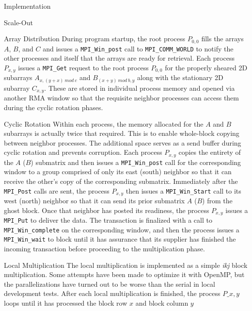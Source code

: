 \documentclass{article}
\begin{document}
\begin{section}{Implementation}
\begin{subsection}{Scale-Out}
\begin{paragraph}{}
    \end{paragraph}
    \begin{paragraph}{Array Distribution}
      During program startup, the root process $P_{0,0}$ fills the arrays $A$, $B$, and $C$ and issues a \texttt{MPI\_Win\_post} call to \texttt{MPI\_COMM\_WORLD}
      to notify the other processes and itself that the arrays are ready for retrieval. Each process $P_{x,y}$ issues a \texttt{MPI\_Get} request
      to the root process $P_{0,0}$ for the properly sheared 2D subarrays $A_{x,(y+x)\ mod\ c}$ and $B_{(x+y)\ mod\ b, y}$ along with the stationary
      2D subarray $C_{x,y}$. These are stored in individual process memory and opened via another RMA window so that the requisite neighbor processes
      can access them during the cyclic rotation phases.
    \end{paragraph}
    \begin{paragraph}{Cyclic Rotation}
      Within each process, the memory allocated for the $A$ and $B$ subarrays is actually twice that required. This is to enable whole-block copying
      between neighbor processes. The additional space serves as a send buffer during cyclic rotation and prevents corruption. Each process $P_{x,y}$
      copies the entirety of the $A$ ($B$) submatrix and then issues a \texttt{MPI\_Win\_post} call for the corresponding window to a group comprised of
      only its east (south) neighbor so that it can receive the other's copy of the corresponding submatrix. Immediately after the \texttt{MPI\_Post}
      calls are sent, the process $P_{x,y}$ then issues a \texttt{MPI\_Win\_Start} call to its west (north) neighbor so that it can send its prior submatrix
      $A$ ($B$) from the ghost block. Once that neighbor has posted its readiness, the process $P_{x,y}$ issues a \texttt{MPI\_Put} to deliver the data.
      The transaction is finalized with a call to \texttt{MPI\_Win\_complete} on the corresponding window, and then the process issues a \texttt{MPI\_Win\_wait}
      to block until it has assurance that its supplier has finished the incoming transaction before proceeding to the multiplication phase.
    \end{paragraph}
    \begin{paragraph}{Local Multiplication}
      The local multiplication is implemented as a simple \emph{ikj} block multiplication. Some attempts have been made to optimize it
      with OpenMP, but the parallelizations have turned out to be worse than the serial in local development tests.
      After each local multiplication is finished, the process $P\_{x,y}$ loops until it has processed the block row $x$ and block column $y$

\end{paragraph}
\end{subsection}
\end{section}
\end{document}
